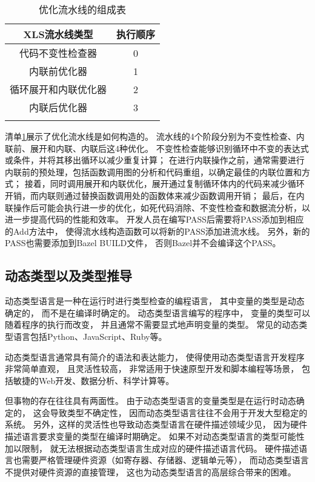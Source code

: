 \begin{table}[ht]
\begin{center}
\caption{优化流水线的组成表}

\begin{tabular}{ c c }
    \Xhline{3\arrayrulewidth}
    XLS流水线类型   & 执行顺序 \\
    \hline
    代码不变性检查器   & 0    \\
    内联前优化器     & 1    \\
    循环展开和内联优化器 & 2    \\
    内联后优化器     & 3   \\
    \Xhline{3\arrayrulewidth}
\end{tabular}

\label{table.1}
\end{center}
\end{table}

清单\ref{table.1}展示了优化流水线是如何构造的。
流水线的4个阶段分别为不变性检查、内联前、展开和内联、内联后这4种优化。
不变性检查能够识别循环中不变的表达式或条件，并将其移出循环以减少重复计算；
在进行内联操作之前，通常需要进行内联前的预处理，包括函数调用图的分析和代码重组，以确定最佳的内联位置和方式；
接着，同时调用展开和内联优化，展开通过复制循环体内的代码来减少循环开销，而内联则通过替换函数调用处的函数体来减少函数调用开销；
最后，在内联操作后可能会执行进一步的优化，如死代码消除、不变性检查和数据流分析，以进一步提高代码的性能和效率。
开发人员在编写PASS后需要将PASS添加到相应的Add方法中，
使得流水线构造函数可以将新的PASS添加进流水线。
另外，新的PASS也需要添加到Bazel BUILD文件，
否则Bazel并不会编译这个PASS。

\subsection{动态类型以及类型推导}

动态类型语言是一种在运行时进行类型检查的编程语言，
其中变量的类型是动态确定的，
而不是在编译时确定的。
动态类型语言编写的程序中，
变量的类型可以随着程序的执行而改变，
并且通常不需要显式地声明变量的类型。
常见的动态类型语言包括Python、JavaScript、Ruby等。

动态类型语言通常具有简介的语法和表达能力，
使得使用动态类型语言开发程序非常简单直观，
且灵活性较高，
非常适用于快速原型开发和脚本编程等场景，
包括敏捷的Web开发、数据分析、科学计算等。

但事物的存在往往具有两面性。
由于动态类型语言的变量类型是在运行时动态确定的，
这会导致类型不确定性，
因而动态类型语言往往不会用于开发大型稳定的系统。
另外，这样的灵活性也导致动态类型语言在硬件描述领域少见，
因为硬件描述语言要求变量的类型在编译时期确定。
如果不对动态类型语言的类型可能性加以限制，
就无法根据动态类型语言生成对应的硬件描述语言代码。
硬件描述语言也需要严格管理硬件资源（如寄存器、存储器、逻辑单元等），
而动态类型语言不提供对硬件资源的直接管理，
这也为动态类型语言的高层综合带来的困难。

